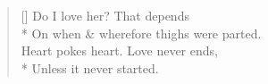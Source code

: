 \begin{verse}[\versewidth]
    Do I love her? That depends\\*
    \vin On when \& wherefore thighs were parted.\\
    Heart pokes heart. Love never ends,\\*
    \vin Unless it never started.
\end{verse}

